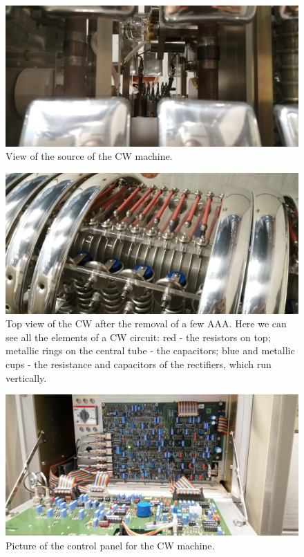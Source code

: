 \begin{refsection}
        \begin{figure}
            \centering
            \includegraphics[width=1\textwidth]{Figures/MEG/CW/view_source.jpg}
            \caption{View of the source of the CW   machine.}
            \label{fig:CW:view_source}
        \end{figure}

        \begin{figure}
            \centering
            \includegraphics[width=1\textwidth]{Figures/MEG/CW/view_top.jpg}
            \caption{Top view of the CW after the removal of a few AAA. Here we can see all the elements of a CW circuit: red - the resistors on top; metallic rings on the central tube - the capacitors; blue and metallic cups - the resistance and capacitors of the rectifiers, which run vertically.}
            \label{fig:CW:view_top}
        \end{figure}

        \begin{figure}
            \centering
            \includegraphics[width=1\textwidth]{Figures/MEG/CW/panel.jpg}
            \caption{Picture of the control panel for the CW machine.}
            \label{fig:CW:panel}
        \end{figure}


\end{refsection}
